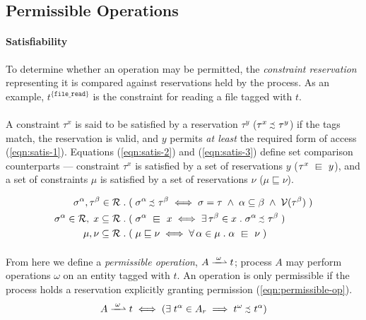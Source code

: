 \subsection{Permissible Operations}
\label{sec:permissible-operations}

\paragraph{Satisfiability} To determine whether an operation may be permitted, the \textit{constraint reservation} representing it is compared against reservations held by the process. As an example, $t^{\{\texttt{file\_read}\}}$ is the constraint for reading a file tagged with $t$.

\paragraph{} A constraint $\tau^{x}$ is said to be satisfied by a reservation $\tau^{y}$ ($\tau^{x} \sprecsim \tau^{y}$) if the tags match, the reservation is valid, and $y$ permits \textit{at least} the required form of access (\ref{eqn:satis-1}). Equations (\ref{eqn:satis-2}) and (\ref{eqn:satis-3}) define set comparison counterparts --- constraint $\tau^{x}$ is satisfied by a set of reservations $y$ ($\tau^{x} \sqin y$), and a set of constraints $\mu$ is satisfied by a set of reservations $\nu$ ($\mu \sqsubseteq \nu$).

\vspace{-5mm}
\begin{align}
    \sigma^{\alpha}, \tau^{\beta} \in \mathcal{R} &\;.\; (\; \sigma^{\alpha} \sprecsim \tau^{\beta} \iff \sigma = \tau \;\wedge\; \alpha \subseteq \beta \;\wedge\; \mathcal{V}(\tau^{\beta}) \;) \label{eqn:satis-1}\\
    \sigma^{\alpha} \in \mathcal{R}, \; x \subseteq \mathcal{R} &\;.\;  (\; \sigma^{\alpha} \sqin x \iff \exists \, \tau^{\beta} \in x \;.\; \sigma^{\alpha} \sprecsim \tau^{\beta} \;) \label{eqn:satis-2}\\
    \mu, \nu \subseteq \mathcal{R} &\;.\;  (\; \mu \sqsubseteq \nu \iff \forall \, \alpha \in \mu \;.\; \alpha \sqin \nu \;) \label{eqn:satis-3}
\end{align}

\paragraph{} From here we define a \textit{permissible operation}, $A \xrightharpoonup{\;\omega\;} t$; process $A$ may perform operations $\omega$ on an entity tagged with $t$. An operation is only permissible if the process holds a reservation explicitly granting permission (\ref{eqn:permissible-op}).
\begin{equation}
    \label{eqn:permissible-op}
    A \xrightharpoonup{\;\omega\;} t \iff (\exists \; t^{\alpha} \in A_r \implies t^{\omega} \sprecsim t^{\alpha})
\end{equation}

